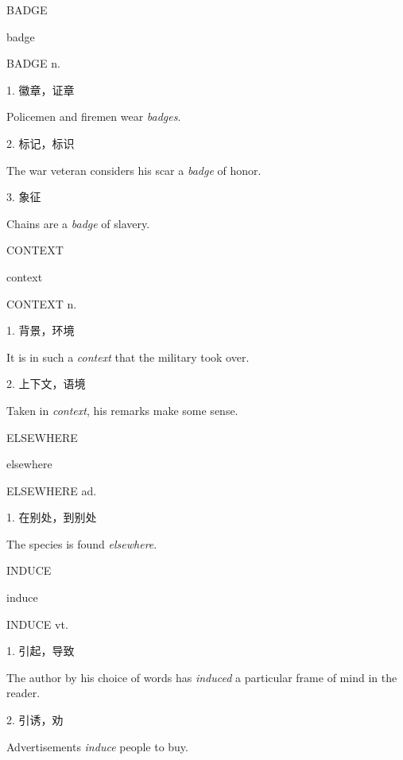 \begin{flashcard}{
BADGE

badge
}
\begin{center}
BADGE n. \textipa{[b\ae d\textyogh]}
\end{center}
1. 徽章，证章

Policemen and firemen wear \textit{badges}.

2. 标记，标识

The war veteran considers his scar a \textit{badge} of honor.

3. 象征

Chains are a \textit{badge} of slavery.

\end{flashcard}
\begin{flashcard}{
CONTEXT

context
}
\begin{center}
CONTEXT n. 
\end{center}
1. 背景，环境

It is in such a \textit{context} that the military took over.

2. 上下文，语境

Taken in \textit{context}, his remarks make some sense.

\end{flashcard}
\begin{flashcard}{
ELSEWHERE

elsewhere
}
\begin{center}
ELSEWHERE ad. 
\end{center}
1. 在别处，到别处

The species is found \textit{elsewhere}.

\end{flashcard}
\begin{flashcard}{
INDUCE

induce
}
\begin{center}
INDUCE vt. 
\end{center}
1. 引起，导致

The author by his choice of words has \textit{induced} a particular frame of mind in the reader.

2. 引诱，劝

Advertisements \textit{induce} people to buy.

\end{flashcard}
